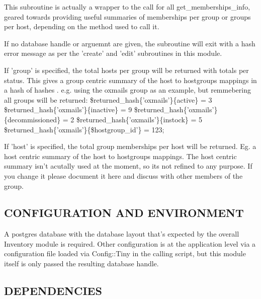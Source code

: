 \documentclass{book}
\begin{document}
This subroutine is actually a wrapper to the call for all get\_memberships\_info, geared towards providing useful summaries of memberships per group or groups per host, depending on the method used to call it.



If no database handle or arguemnt are given, the subroutine will exit with a hash error message as per the 'create' and 'edit' subroutines in this module.



If 'group' is specified, the total hosts per group will be returned with totals per status. This gives a group centric summary of the host to hostgroups mappings in a hash of hashes . e.g. using the oxmails group as an example, but remmebering all groups will be returned: \$returned\_hash\{'oxmails'\}\{active\} = 3 \$returned\_hash\{'oxmails'\}\{inactive\} = 9 \$returned\_hash\{'oxmails'\}\{decommissioned\} = 2 \$returned\_hash\{'oxmails'\}\{instock\} = 5 \$returned\_hash\{'oxmails'\}\{\$hostgroup\_id'\} = 123;



If 'host' is specified, the total group memberships per host will be returned. Eg. a host centric summary of the host to hostgroups mappings. The host centric summary isn't acutally used at the moment, so its not refined to any purpose. If you change it please document it here and discuss with other members of the group.


\subsection{CONFIGURATION AND ENVIRONMENT}
\label{Inventory::Memberships_CONFIGURATION_AND_ENVIRONMENT}
\hypertarget{Inventory::Memberships_CONFIGURATION_AND_ENVIRONMENT}{}



A postgres database with the database layout that's expected by the overall Inventory module is required. Other configuration is at the application level via a configuration file loaded via Config::Tiny in the calling script, but this module itself is only passed the resulting database handle.


\subsection{DEPENDENCIES}
\label{Inventory::Memberships_DEPENDENCIES}
\hypertarget{Inventory::Memberships_DEPENDENCIES}{}
\end{document}
